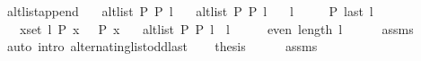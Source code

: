 \begin{isabellebody}
\isamarkupfalse%
%
\endisatagproof
{\isafoldproof}%
%
\isadelimproof
\isanewline
%
\endisadelimproof
%
\isadeliminvisible
\isanewline
%
\endisadeliminvisible
%
\isataginvisible
{}\isamarkupfalse%
\ alt{\isacharunderscore}{\kern0pt}list{\isacharunderscore}{\kern0pt}append{\isacharunderscore}{\kern0pt}{}{\isacharprime}{\kern0pt}{\isacharcolon}{\kern0pt}\isanewline
\ \ \ {\isachardoublequoteopen}alt{\isacharunderscore}{\kern0pt}list\ P{}\ P{}\ l{}{\isachardoublequoteclose}\isanewline
\ \ \ {\isachardoublequoteopen}alt{\isacharunderscore}{\kern0pt}list\ P{}\ P{}\ l{}{\isachardoublequoteclose}\isanewline
\ \ \ {\isachardoublequoteopen}l{}\ {\isasymnoteq}\ {\isacharbrackleft}{\kern0pt}{\isacharbrackright}{\kern0pt}{\isachardoublequoteclose}\isanewline
\ \ \ {\isachardoublequoteopen}P{}\ {\isacharparenleft}{\kern0pt}last\ l{}{\isacharparenright}{\kern0pt}{\isachardoublequoteclose}\isanewline
\ \ \ {\isachardoublequoteopen}{\isasymforall}x{\isasymin}set\ l{}{\isachardot}{\kern0pt}\ P{}\ x\ {\isasymlongleftrightarrow}\ {\isasymnot}\ P{}\ x{\isachardoublequoteclose}\isanewline
\ \ \ {\isachardoublequoteopen}alt{\isacharunderscore}{\kern0pt}list\ P{}\ P{}\ {\isacharparenleft}{\kern0pt}l{}\ {\isacharat}{\kern0pt}\ l{}{\isacharparenright}{\kern0pt}{\isachardoublequoteclose}%
\endisataginvisible
{\isafoldinvisible}%
%
\isadeliminvisible
\isanewline
%
\endisadeliminvisible
%
\isadelimproof
%
\endisadelimproof
%
\isatagproof
{}\isamarkupfalse%
\ {\isacharminus}{\kern0pt}\isanewline
\ \ \isamarkupfalse%
\ {\isachardoublequoteopen}even\ {\isacharparenleft}{\kern0pt}length\ l{}{\isacharparenright}{\kern0pt}{\isachardoublequoteclose}\isanewline
\ \ \ \ \isamarkupfalse%
\ assms\isanewline
\ \ \ \ \isamarkupfalse%
\ {\isacharparenleft}{\kern0pt}auto\ intro{\isacharcolon}{\kern0pt}\ alternating{\isacharunderscore}{\kern0pt}list{\isacharunderscore}{\kern0pt}odd{\isacharunderscore}{\kern0pt}last{\isacharparenright}{\kern0pt}\isanewline
\ \ \isamarkupfalse%
\ {\isacharquery}{\kern0pt}thesis\isanewline
\ \ \ \ \isamarkupfalse%
\ assms{\isacharparenleft}{\kern0pt}{}{\isacharcomma}{\kern0pt}\ {}{\isacharparenright}{\kern0pt}\isanewline

\end{isabellebody}
